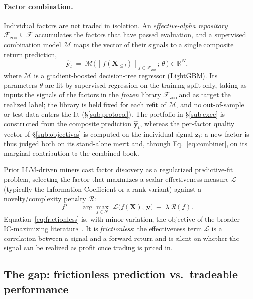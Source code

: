 \documentclass[11pt]{article}
\newcommand{\R}{\mathbb{R}}
\newcommand{\Fspace}{\mathcal{F}}
\newcommand{\sign}{\mathbf{z}}
\newcommand{\zoo}{\Fspace_{\mathrm{zoo}}}
\newcommand{\pred}{\hat{\bm{y}}}
\newcommand{\combiner}{\mathcal{M}}
\begin{document}
\paragraph{Factor combination.}
Individual factors are not traded in isolation. An \emph{effective-alpha repository}
$\zoo\subseteq\Fspace$ accumulates the factors that have passed evaluation, and a
supervised combination model $\combiner$ maps the vector of their signals to a single
composite return prediction,
\begin{equation}
  \pred_t \;=\; \combiner\big(\,[\,f(\bm{X}_{\le t})\,]_{f\in\zoo}\,;\,\theta\,\big)\in\R^{N},
  \label{eq:combiner}
\end{equation}
where $\combiner$ is a gradient-boosted decision-tree regressor (LightGBM). Its
parameters $\theta$ are fit by supervised
regression on the training split only, taking as inputs the signals of the factors in
the \emph{frozen} library $\zoo$ and as target the realized label; the library is held
fixed for each refit of $\combiner$, and no out-of-sample or test data enters the fit
(\S\ref{sub:protocol}). The portfolio in \S\ref{sub:exec} is constructed from the
composite prediction $\pred_t$, whereas the per-factor quality vector of
\S\ref{sub:objectives} is computed on the individual signal $\sign_t$; a new factor is
thus judged both on its stand-alone merit and, through Eq.~\eqref{eq:combiner}, on its
marginal contribution to the combined book.

Prior LLM-driven miners cast factor discovery as a regularized predictive-fit problem,
selecting the factor that maximizes a scalar effectiveness measure $\mathcal{L}$
(typically the Information Coefficient or a rank variant) against a novelty/complexity
penalty $\mathcal{R}$:
\begin{equation}
  f^\star \;=\; \arg\max_{f\in\Fspace}\;
  \mathcal{L}\!\big(f(\bm{X}),\,\bm{y}\big)\;-\;\lambda\,\mathcal{R}(f).
  \label{eq:frictionless}
\end{equation}
Equation~\eqref{eq:frictionless} is, with minor variation, the objective of the broader
IC-maximizing literature~\cite{han2026quantaalpha,shi2025alphajungle}. It is
\emph{frictionless}: the
effectiveness term $\mathcal{L}$ is a correlation between a signal and a forward return
and is silent on whether the signal can be realized as profit once trading is priced
in.

\subsection{The gap: frictionless prediction vs.\ tradeable performance}
\label{sub:gap}
\end{document}
